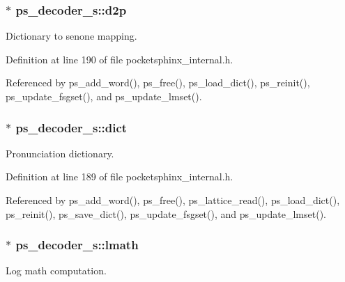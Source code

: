 \subsubsection[{d2p}]{$\ast$ ps\-\_\-decoder\-\_\-s\-::d2p}\label{structps__decoder__s_ae6515cbc261686f3f3bbd95719f79793}


Dictionary to senone mapping. 



Definition at line 190 of file pocketsphinx\-\_\-internal.\-h.



Referenced by ps\-\_\-add\-\_\-word(), ps\-\_\-free(), ps\-\_\-load\-\_\-dict(), ps\-\_\-reinit(), ps\-\_\-update\-\_\-fsgset(), and ps\-\_\-update\-\_\-lmset().

\subsubsection[{dict}]{$\ast$ ps\-\_\-decoder\-\_\-s\-::dict}\label{structps__decoder__s_aef6228c17907cc1d0cef835b238b5d91}


Pronunciation dictionary. 



Definition at line 189 of file pocketsphinx\-\_\-internal.\-h.



Referenced by ps\-\_\-add\-\_\-word(), ps\-\_\-free(), ps\-\_\-lattice\-\_\-read(), ps\-\_\-load\-\_\-dict(), ps\-\_\-reinit(), ps\-\_\-save\-\_\-dict(), ps\-\_\-update\-\_\-fsgset(), and ps\-\_\-update\-\_\-lmset().

\subsubsection[{lmath}]{$\ast$ ps\-\_\-decoder\-\_\-s\-::lmath}\label{structps__decoder__s_abd17fe329f2fb219c5a534f3217c5b95}


Log math computation. 



